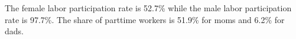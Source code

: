 The female labor participation rate is 52.7\% while the male labor participation rate is 97.7\%. The share of parttime workers is 51.9\% for moms and 6.2\% for dads.
